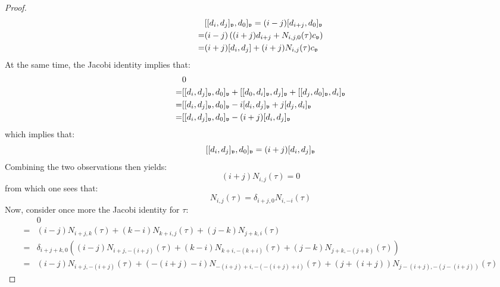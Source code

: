 \begin{proof}
$$\begin{aligned}
                            & [[d_i, d_j]_{\frakv}, d_0]_{\frakv} = (i - j) [d_{i + j}, d_0]_{\frakv}
                            \\
                            = & (i - j) \left( (i + j) d_{i + j} + N_{i, j, 0}(\tau) c_{\frakv} \right)
                            \\
                            = & (i + j) [d_i, d_j] + (i + j) N_{i, j}(\tau) c_{\frakv}
                        \end{aligned}
                    $$
                At the same time, the Jacobi identity implies that:
                    $$
                        \begin{aligned}
                            & 0
                            \\
                            = & [[d_i, d_j]_{\frakv}, d_0]_{\frakv} + [[d_0, d_i]_{\frakv}, d_j]_{\frakv} + [[d_j, d_0]_{\frakv}, d_i]_{\frakv}
                            \\
                            = & [[d_i, d_j]_{\frakv}, d_0]_{\frakv} - i [d_i, d_j]_{\frakv} + j [d_j, d_i]_{\frakv}
                            \\
                            = & [[d_i, d_j]_{\frakv}, d_0]_{\frakv} - (i + j) [d_i, d_j]_{\frakv}
                        \end{aligned}
                    $$
                which implies that:
                    $$[[d_i, d_j]_{\frakv}, d_0]_{\frakv} = (i + j) [d_i, d_j]_{\frakv}$$
                Combining the two observations then yields:
                    $$(i + j) N_{i, j}(\tau) = 0$$
                from which one sees that:
                    $$N_{i, j}(\tau) = \delta_{i + j, 0} N_{i, -i}(\tau)$$
                Now, consider once more the Jacobi identity for $\tau$:
                    $$
                        \begin{aligned}
                            & 0
                            \\
                            = & (i - j) N_{i + j, k}(\tau) + (k - i) N_{k + i, j}(\tau) + (j - k) N_{j + k, i}(\tau)
                            \\
                            = & \delta_{i + j + k, 0} \left( (i - j)  N_{i + j, -(i + j)}(\tau) + (k - i) N_{k + i, -(k + i)}(\tau) + (j - k) N_{j + k, -(j + k)}(\tau) \right)
                            \\
                            = & (i - j)  N_{i + j, -(i + j)}(\tau) + (-(i + j) - i) N_{-(i + j) + i, -(-(i + j) + i)}(\tau) + (j + (i + j)) N_{j - (i + j), -(j -(i + j))}(\tau)

\end{aligned}$$
\end{proof}
